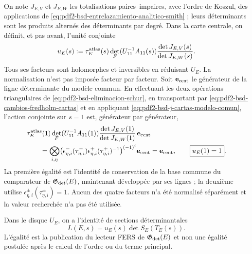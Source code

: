 On note $J_{E,V}$ et $J_{E,W}$ les totalisations paires--impaires, avec
l'ordre de Koszul, des applications de
\eqref{eq:pdf2-bsd-entrelazamiento-analitico-smith} ; leurs déterminants sont
les produits alternés des déterminants par degré. Dans la carte centrale,
on définit, et pas avant, l'unité conjointe
\begin{equation}\label{eq:pdf2-bsd-u-e-construida}
 u_E(s):=\tau_E^{\rm atlas}(s)
 \det_F(U_{11}^{-1}A_{11}(s))
 \frac{\det J_{E,V}(s)}
      {\det J_{E,W}(s)}.
\end{equation}
Tous ses facteurs sont holomorphes et inversibles en réduisant $U_E$. La
normalisation n'est pas imposée facteur par facteur. Soit $\mathbf e_{\rm cent}$ le
générateur de la ligne déterminante du modèle commun. En effectuant les deux
opérations triangulaires de \eqref{eq:pdf2-bsd-eliminacion-schur}, en transportant
par \eqref{eq:pdf2-bsd-cambios-fredholm-cartas} et en appliquant
\eqref{eq:pdf2-bsd-j-cartas-modelo-comun}, l'action conjointe sur $s=1$ est,
générateur par générateur,
\begin{equation}\label{eq:pdf2-bsd-u-e-normalizacion-probada}
 \begin{aligned}
 &\tau_E^{\rm atlas}(1)
 \det_F(U_{11}^{-1}A_{11}(1))
 \frac{\det J_{E,V}(1)}
      {\det J_{E,W}(1)}\,\mathbf e_{\rm cent}\\
 &\qquad=
 \bigotimes_{i,\eta}
 \bigl(\epsilon_{\eta,i}^-(\tau_{\eta,i}^-)
       \epsilon_{\eta,i}^+(\tau_{\eta,i}^+)^{-1}\bigr)^{(-1)^i}
 \mathbf e_{\rm cent}
 =\mathbf e_{\rm cent},
 \qquad \boxed{u_E(1)=1}.
 \end{aligned}
\end{equation}
La première égalité est l'identité de conservation de la base commune du
comparateur de $\mathfrak G_{\rm det}(E)$, maintenant développée par ses lignes ; la
deuxième utilise
$\epsilon_{\eta,i}^\pm(\tau_{\eta,i}^\pm)=1$. Aucun
des quatre facteurs n'a été normalisé séparément et la valeur recherchée n'a pas été utilisée.

\begin{proposition}
\label{prop:pdf2-bsd-fers-factorizacion-owner}
Dans le disque $U_E$, on a l'identité de sections déterminantales
\begin{equation}\label{eq:pdf2-bsd-factorizacion-analitica}
 \boxed{L(E,s)=u_E(s)\det S_E(T_E(s)).}
\end{equation}
L'égalité est la publication du lecteur FERS de
$\mathfrak G_{\rm det}(E)$ et non une égalité postulée après
le calcul de l'ordre ou du terme principal.
\end{proposition}

